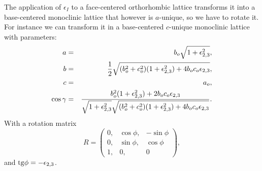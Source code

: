 \documentclass[12pt,a4paper]{article}
\begin{document}
The application of $\epsilon_I$ to a face-centered orthorhombic lattice
transforms it into a base-centered monoclinic lattice that however is 
$a$-unique, so we have to rotate it. For instance we can transform it
in a base-centered $c$-unique monoclinic lattice with parameters:
\begin{eqnarray}
a&=&b_o \sqrt{1+\epsilon_{2,3}^2}, \\
b&=&{1\over 2} \sqrt{(b_o^2+c_o^2)(1+\epsilon_{2,3}^2)+4b_oc_o
\epsilon_{2,3}}, \\
c&=&a_o,  \\
\cos\gamma &=& {b_o^2 (1+\epsilon_{2,3}^2)+2b_oc_o\epsilon_{2,3} \over
\sqrt{1+\epsilon_{2,3}^2} \sqrt{(b_o^2+c_o^2)
(1+\epsilon_{2,3}^2)+4b_oc_o\epsilon_{2,3}}}. 
\end{eqnarray}
With a rotation matrix
\begin{equation}
R=\left( \begin{array}{ccc}
0, & \cos \phi, &  -\sin \phi
\\
0, & \sin \phi, & \cos \phi 
\\
1, & 0, & 0
\end{array}
\right),
\end{equation}
and ${\rm tg} \phi =-\epsilon_{2,3}$.
\end{document}
